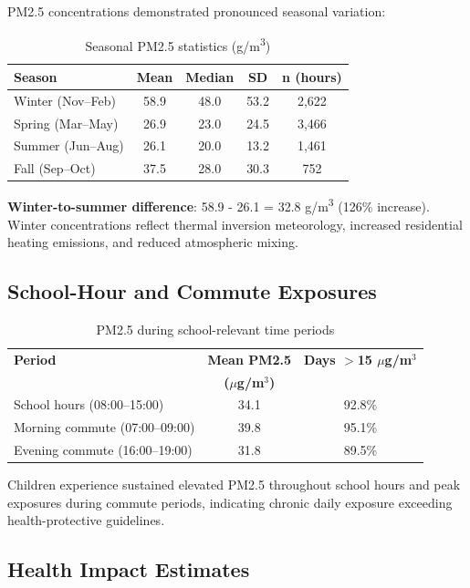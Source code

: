 \documentclass[11pt,a4paper]{article}
\begin{document}
PM2.5 concentrations demonstrated pronounced seasonal variation:

\begin{table}[H]
\centering
\caption{Seasonal PM2.5 statistics (\textmu g/m\textsuperscript{3})}
\label{tab:seasonal_8881}
\begin{tabular}{lcccc}
\toprule
\textbf{Season} & \textbf{Mean} & \textbf{Median} & \textbf{SD} & \textbf{n (hours)} \\
\midrule
Winter (Nov--Feb) & 58.9 & 48.0 & 53.2 & 2,622 \\
Spring (Mar--May) & 26.9 & 23.0 & 24.5 & 3,466 \\
Summer (Jun--Aug) & 26.1 & 20.0 & 13.2 & 1,461 \\
Fall (Sep--Oct) & 37.5 & 28.0 & 30.3 & 752 \\
\bottomrule
\end{tabular}
\end{table}

\textbf{Winter-to-summer difference}: 58.9 - 26.1 = 32.8 \textmu g/m\textsuperscript{3} (126\% increase). Winter concentrations reflect thermal inversion meteorology, increased residential heating emissions, and reduced atmospheric mixing.

\subsection{School-Hour and Commute Exposures}

\begin{table}[H]
\centering
\caption{PM2.5 during school-relevant time periods}
\label{tab:school_hours}
\begin{tabular}{lcc}
\toprule
\textbf{Period} & \textbf{Mean PM2.5} & \textbf{Days $>$15 $\mu$g/m$^3$} \\
 & \textbf{($\mu$g/m$^3$)} & \\
\midrule
School hours (08:00--15:00) & 34.1 & 92.8\% \\
Morning commute (07:00--09:00) & 39.8 & 95.1\% \\
Evening commute (16:00--19:00) & 31.8 & 89.5\% \\
\bottomrule
\end{tabular}
\end{table}

Children experience sustained elevated PM2.5 throughout school hours and peak exposures during commute periods, indicating chronic daily exposure exceeding health-protective guidelines.

\subsection{Health Impact Estimates}
\end{document}
